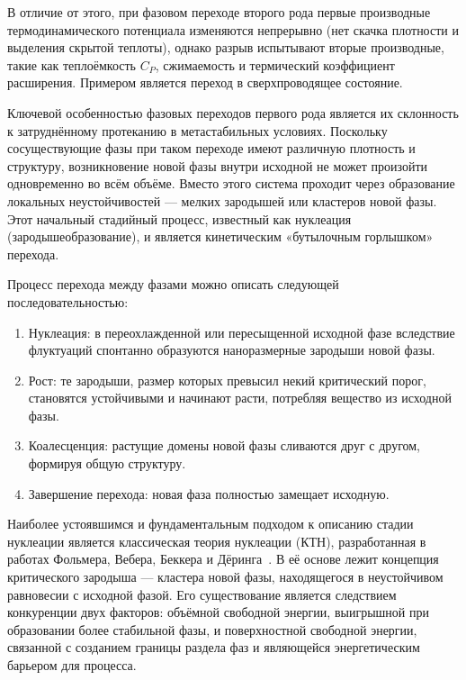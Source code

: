 В отличие от этого, при фазовом переходе второго рода первые производные термодинамического потенциала изменяются непрерывно (нет скачка плотности и выделения скрытой теплоты), однако разрыв испытывают вторые производные, такие как теплоёмкость  $C_P$, сжимаемость и термический коэффициент расширения. Примером является переход в сверхпроводящее состояние.

Ключевой особенностью фазовых переходов первого рода является их склонность к затруднённому протеканию в метастабильных условиях. Поскольку сосуществующие фазы при таком переходе имеют различную плотность и структуру, возникновение новой фазы внутри исходной не может произойти одновременно во всём объёме. Вместо этого система проходит через образование локальных неустойчивостей — мелких зародышей или кластеров новой фазы. Этот начальный стадийный процесс, известный как нуклеация (зародышеобразование), и является кинетическим «бутылочным горлышком» перехода.


Процесс перехода между фазами можно описать следующей последовательностью:

\begin{enumerate}

\item Нуклеация: в переохлажденной или пересыщенной исходной фазе вследствие флуктуаций спонтанно образуются наноразмерные зародыши новой фазы.
\item Рост: те зародыши, размер которых превысил некий критический порог, становятся устойчивыми и начинают расти, потребляя вещество из исходной фазы.
\item Коалесценция: растущие домены новой фазы сливаются друг с другом, формируя общую структуру.
\item Завершение перехода: новая фаза полностью замещает исходную.

\end{enumerate}


Наиболее устоявшимся и фундаментальным подходом к описанию стадии нуклеации является классическая теория нуклеации (КТН), разработанная в работах Фольмера, Вебера, Беккера и Дёринга~\cite{pruppacher_microphysics_1996}. В её основе лежит концепция критического зародыша — кластера новой фазы, находящегося в неустойчивом равновесии с исходной фазой. Его существование является следствием конкуренции двух факторов: объёмной свободной энергии, выигрышной при образовании более стабильной фазы, и поверхностной свободной энергии, связанной с созданием границы раздела фаз и являющейся энергетическим барьером для процесса.

